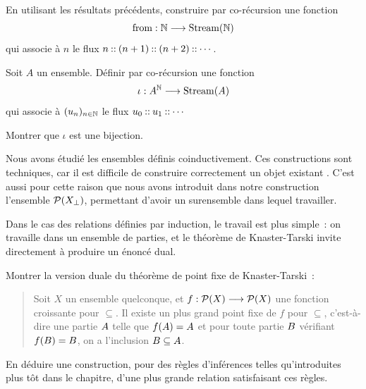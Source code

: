 \begin{problem}[La coinduction]

  \begin{pbQuest}
  \item En utilisant les résultats précédents, construire par co-récursion une
    fonction
    \[\operatorname{from} : \displaystyle \mathbb N \longrightarrow \operatorname{Stream}(\mathbb N)\]
    qui associe à $n$ le flux $n \mathbin{::} (n+1)\mathbin{::} (n+2) \mathbin{::} \cdots$.
  \item Soit $A$ un ensemble. Définir par co-récursion une fonction
    \[\iota : \displaystyle A^\mathbb N \longrightarrow \operatorname{Stream}(A)\]
    qui associe à $(u_n)_{n \in \mathbb N}$ le flux $u_0 \mathbin{::} u_1 \mathbin{::} \cdots$
  \item Montrer que $\iota$ est une bijection.
  \end{pbQuest}


  Nous avons étudié les ensembles définis coinductivement. Ces constructions
  sont techniques, car il est difficile de construire correctement un objet
  existant . C'est aussi pour cette raison que nous avons
  introduit dans notre construction l'ensemble $\mathcal{P}(X_\bot)$, permettant
  d'avoir un surensemble dans lequel travailler.

  Dans le cas des relations définies par induction, le travail est plus simple~:
  on travaille  dans un ensemble de parties, et le théorème
  de Knaster-Tarski invite directement à produire un énoncé dual.

  \begin{pbQuest}
  \item Montrer la version duale du théorème de point fixe de Knaster-Tarski~:
    \begin{quotation}
      \noindent
      Soit $X$ un ensemble quelconque, et
      $f : \displaystyle \mathcal{P}(X) \longrightarrow \mathcal{P}(X)$
      une fonction croissante pour $\subseteq$. Il existe un plus grand point
      fixe de $f$ pour $\subseteq$, c'est-à-dire une partie $A$ telle que
      $f(A) = A$ et pour toute partie $B$ vérifiant
      $f(B) = B$, on a l'inclusion $B \subseteq A$.
    \end{quotation}
  \item En déduire une construction, pour des règles d'inférences telles
    qu'introduites plus tôt dans le chapitre, d'une plus grande relation
    satisfaisant ces règles.
  \end{pbQuest}


\end{problem}
